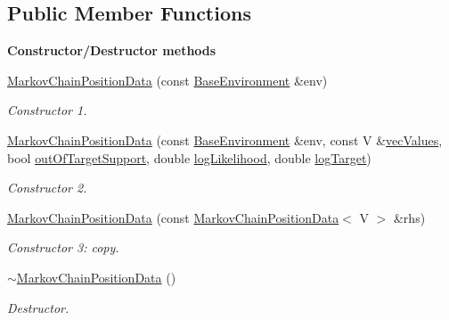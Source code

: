 \subsection*{Public Member Functions}
\begin{Indent}{\bf Constructor/\-Destructor methods}\par
\begin{DoxyCompactItemize}
\item 
\hyperlink{class_q_u_e_s_o_1_1_markov_chain_position_data_acbfcf6d39cc6a76a67e3d3ed0f8e2d6d}{Markov\-Chain\-Position\-Data} (const \hyperlink{class_q_u_e_s_o_1_1_base_environment}{Base\-Environment} \&env)
\begin{DoxyCompactList}\small\item\em Constructor 1. \end{DoxyCompactList}\item 
\hyperlink{class_q_u_e_s_o_1_1_markov_chain_position_data_ae184243490ce9d3decb2d0a2798f3b4c}{Markov\-Chain\-Position\-Data} (const \hyperlink{class_q_u_e_s_o_1_1_base_environment}{Base\-Environment} \&env, const V \&\hyperlink{class_q_u_e_s_o_1_1_markov_chain_position_data_a1ad19966c9bcb480d4f055ab6f3dc244}{vec\-Values}, bool \hyperlink{class_q_u_e_s_o_1_1_markov_chain_position_data_a466849f2d261962720d7c8968e95b5f1}{out\-Of\-Target\-Support}, double \hyperlink{class_q_u_e_s_o_1_1_markov_chain_position_data_a4d0fc22cd5a10065474ceaba13d18857}{log\-Likelihood}, double \hyperlink{class_q_u_e_s_o_1_1_markov_chain_position_data_aa553894577fdc44739538bf51d30555b}{log\-Target})
\begin{DoxyCompactList}\small\item\em Constructor 2. \end{DoxyCompactList}\item 
\hyperlink{class_q_u_e_s_o_1_1_markov_chain_position_data_af051af85a8f286804dcf11b6eeae1be7}{Markov\-Chain\-Position\-Data} (const \hyperlink{class_q_u_e_s_o_1_1_markov_chain_position_data}{Markov\-Chain\-Position\-Data}$<$ V $>$ \&rhs)
\begin{DoxyCompactList}\small\item\em Constructor 3\-: copy. \end{DoxyCompactList}\item 
\hyperlink{class_q_u_e_s_o_1_1_markov_chain_position_data_a17b359c50ca7914e9698f0ebcf29a19d}{$\sim$\-Markov\-Chain\-Position\-Data} ()
\begin{DoxyCompactList}\small\item\em Destructor. \end{DoxyCompactList}\end{DoxyCompactItemize}
\end{Indent}
